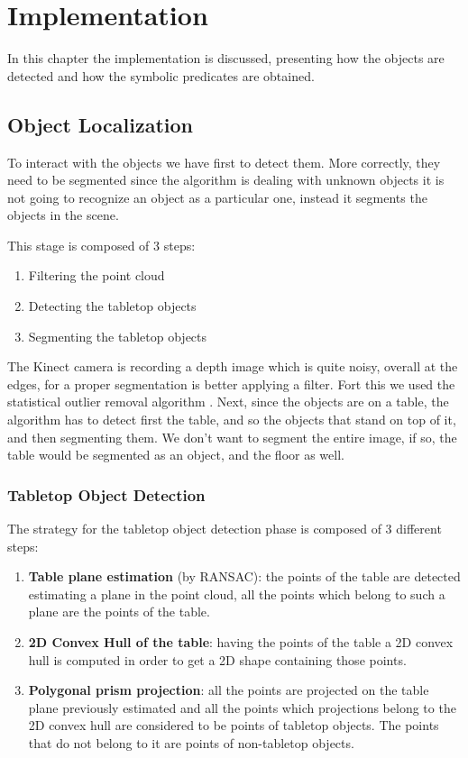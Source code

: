 \chapter{Implementation}
\label{ch:implementation}

In this chapter the implementation is discussed, presenting how the objects are detected and how the symbolic predicates are obtained. 

\section{Object Localization} 
To interact with the objects we have first to detect them. More correctly, they need to be segmented since the algorithm is dealing with unknown objects it is not going to recognize an object as a particular one, instead it segments the objects in the scene. 

This stage is composed of 3 steps:
\begin{enumerate}
\item Filtering the point cloud
\item Detecting the tabletop objects
\item Segmenting the tabletop objects
\end{enumerate}
The Kinect camera is recording a depth image which is quite noisy, overall at the edges, for a proper segmentation is better applying a filter. Fort this we used the statistical outlier removal algorithm \citep{rusu2008towards}.	
Next, since the objects are on a table, the algorithm has to detect first the table, and so the objects that stand on top of it, and then segmenting them. We don't want to segment the entire image, if so, the table would be segmented as an object, and the floor as well.

\subsection{Tabletop Object Detection} 
The strategy for the tabletop object detection phase is composed of 3 different steps:
\begin{enumerate}
\item \textbf{Table plane estimation} (by RANSAC): the points of the table are detected estimating a plane in the point cloud, all the points which belong to such a plane are the points of the table. 
\item \textbf{2D Convex Hull of the table}: having the points of the table a 2D convex hull is computed in order to get a 2D shape containing those points.
\item \textbf{Polygonal prism projection}: all the points are projected on the table plane previously estimated and all the points which projections belong to the 2D convex hull are considered to be points of tabletop objects. The points that do not belong to it are points of non-tabletop objects.
\end{enumerate}

